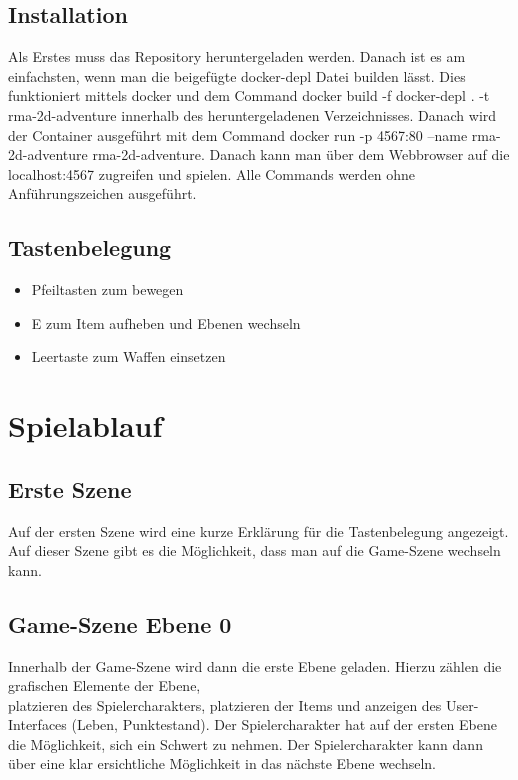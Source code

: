\documentclass[12pt,a4paper]{article}
\begin{document}
\newpage

\subsection{Installation}
Als Erstes muss das Repository heruntergeladen werden. Danach ist es am einfachsten, wenn man die beigefügte docker-depl Datei builden lässt. Dies funktioniert mittels docker und dem Command \glqq docker build -f docker-depl . -t rma-2d-adventure\grqq{} innerhalb des heruntergeladenen Verzeichnisses. Danach wird der Container ausgeführt mit dem Command \glqq docker run -p 4567:80 --name rma-2d-adventure rma-2d-adventure\grqq. Danach kann man über dem Webbrowser auf die localhost:4567 zugreifen und spielen. Alle Commands werden ohne Anführungszeichen ausgeführt.

\subsection{Tastenbelegung}
\begin{itemize}
    \item Pfeiltasten zum bewegen
    \item E zum Item aufheben und Ebenen wechseln
    \item Leertaste zum Waffen einsetzen
\end{itemize}


\section{Spielablauf}
\subsection{Erste Szene}
Auf der ersten Szene wird eine kurze Erklärung für die Tastenbelegung angezeigt. Auf dieser Szene gibt es die Möglichkeit, dass man auf die Game-Szene wechseln kann.

\subsection{Game-Szene Ebene 0}
Innerhalb der Game-Szene wird dann die erste Ebene geladen. Hierzu zählen die grafischen Elemente der Ebene,\\platzieren des Spielercharakters, platzieren der Items und anzeigen des User-Interfaces (Leben, Punktestand). Der Spielercharakter hat auf der ersten Ebene die Möglichkeit, sich ein Schwert zu nehmen. Der Spielercharakter kann dann über eine klar ersichtliche Möglichkeit in das nächste Ebene wechseln.
\end{document}
